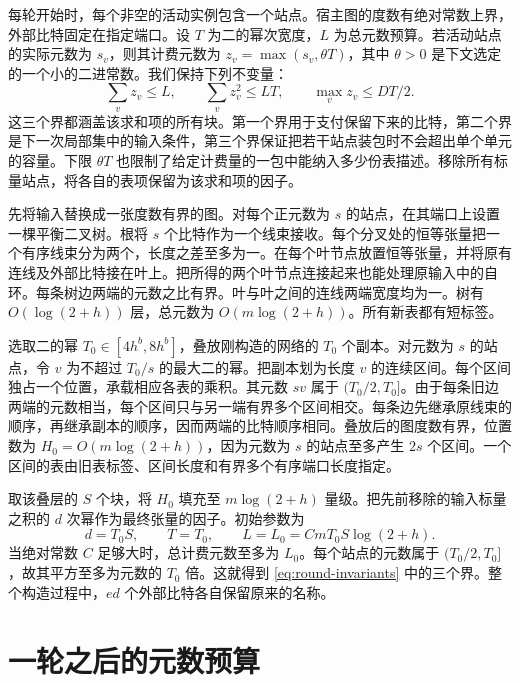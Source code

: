 每轮开始时，每个非空的活动实例包含一个站点。宿主图的度数有绝对常数上界，外部比特固定在指定端口。设 $T$ 为二的幂次宽度，$L$ 为总元数预算。若活动站点的实际元数为 $s_v$，则其计费元数为 $z_v=\max(s_v,\theta T)$，其中 $\theta>0$ 是下文选定的一个小的二进常数。我们保持下列不变量：\begin{equation}\label{eq:round-invariants}
 \sum_v z_v\le L,\qquad \sum_v z_v^2\le LT,\qquad
 \max_v z_v\le DT/2 .
\end{equation} 这三个界都涵盖该求和项的所有块。第一个界用于支付保留下来的比特，第二个界是下一次局部集中的输入条件，第三个界保证把若干站点装包时不会超出单个单元的容量。下限 $\theta T$ 也限制了给定计费量的一包中能纳入多少份表描述。移除所有标量站点，将各自的表项保留为该求和项的因子。

先将输入替换成一张度数有界的图。对每个正元数为 $s$ 的站点，在其端口上设置一棵平衡二叉树。根将 $s$ 个比特作为一个线束接收。每个分叉处的恒等张量把一个有序线束分为两个，长度之差至多为一。在每个叶节点放置恒等张量，并将原有连线及外部比特接在叶上。把所得的两个叶节点连接起来也能处理原输入中的自环。每条树边两端的元数之比有界。叶与叶之间的连线两端宽度均为一。树有 $O(\log(2+h))$ 层，总元数为 $O(m\log(2+h))$。所有新表都有短标签。

选取二的幂 $T_0\in[4h^b,8h^b]$，叠放刚构造的网络的 $T_0$ 个副本。对元数为 $s$ 的站点，令 $v$ 为不超过 $T_0/s$ 的最大二的幂。把副本划为长度 $v$ 的连续区间。每个区间独占一个位置，承载相应各表的乘积。其元数 $sv$ 属于 $(T_0/2,T_0]$。由于每条旧边两端的元数相当，每个区间只与另一端有界多个区间相交。每条边先继承原线束的顺序，再继承副本的顺序，因而两端的比特顺序相同。叠放后的图度数有界，位置数为 $H_0=O(m\log(2+h))$，因为元数为 $s$ 的站点至多产生 $2s$ 个区间。一个区间的表由旧表标签、区间长度和有界多个有序端口长度指定。

取该叠层的 $S$ 个块，将 $H_0$ 填充至 $m\log(2+h)$ 量级。把先前移除的输入标量之积的 $d$ 次幂作为最终张量的因子。初始参数为 \begin{equation}\label{eq:round-start}
 d=T_0S,\qquad T=T_0,\qquad L=L_0=CmT_0S\log(2+h).
\end{equation} 当绝对常数 $C$ 足够大时，总计费元数至多为 $L_0$。每个站点的元数属于 $(T_0/2,T_0]$，故其平方至多为元数的 $T_0$ 倍。这就得到 \eqref{eq:round-invariants} 中的三个界。整个构造过程中，$ed$ 个外部比特各自保留原来的名称。



\section{一轮之后的元数预算}\label{sec:full}

